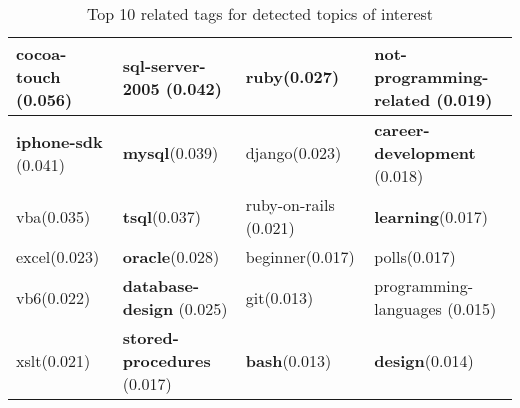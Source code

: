 \begin{sidewaystable}
\begin{tabular}{|l|l|l|l|}
\hline
 \textbf{cocoa-touch} (0.056)& \textbf{sql-server-2005} (0.042)& \textbf{ruby}(0.027)& \textbf{not-programming-related} (0.019) \\ 
\hline
 \textbf{iphone-sdk} (0.041)& \textbf{mysql}(0.039)& django(0.023)& \textbf{career-development} (0.018) \\ 
\hline
 vba(0.035)& \textbf{tsql}(0.037)& ruby-on-rails (0.021)& \textbf{learning}(0.017) \\ 
\hline
 excel(0.023)& \textbf{oracle}(0.028)& beginner(0.017)& polls(0.017) \\ 
\hline
 vb6(0.022)& \textbf{database-design} (0.025)& git(0.013)& programming-languages (0.015) \\ 
\hline
 xslt(0.021)& \textbf{stored-procedures} (0.017)& \textbf{bash}(0.013)& \textbf{design}(0.014) \\ 
\hline
\end{tabular}
\caption{Top 10 related tags for detected topics of interest}
\label{tab:ldaresult1}
\end{sidewaystable}

